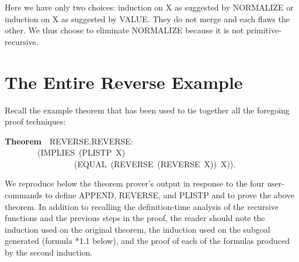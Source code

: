 \documentclass[10pt]{book}
\newenvironment{pubasis}{\begin{flushleft}}{\end{flushleft}}
\newcommand{\axiomordefinition}[1]{\vspace{6pt}\Large\textsf{\textbf{#1}}\normalsize}
\begin{document}
Here we  have only two choices: induction on X as suggested by
NORMALIZE or induction on X 
as suggested by VALUE.  They do not merge and each flaws
the other.  We thus choose to eliminate
NORMALIZE because it is not primitive-recursive.

\section{The Entire Reverse Example}
Recall the example theorem that has been used to tie together all the foregoing proof techniques:
\begin{pubasis}
\axiomordefinition{Theorem}~~REVERSE.REVERSE:\\
~~~~~~~~(IMPLIES~(PLISTP~X)\\
~~~~~~~~~~~~~~~~~(EQUAL~(REVERSE~(REVERSE~X))~X)).\\
\end{pubasis}
We reproduce below the theorem prover's output
in response to the four user-commands to define APPEND, REVERSE,
and PLISTP and to prove the above theorem.
In addition to recalling the definition-time analysis of the recursive
functions and the previous steps in the proof, the reader
should note the induction used on the original theorem, the induction
used on the subgoal generated (formula *1.1 below), and the proof of
each of the formulas produced by the second induction.
\end{document}
